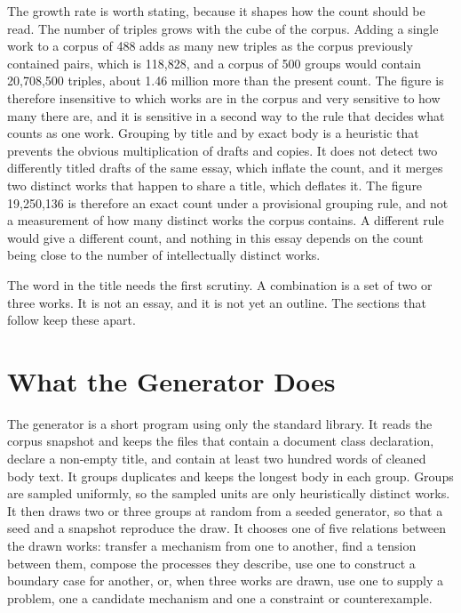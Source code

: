 \documentclass[11pt]{article}
\begin{document}
The growth rate is worth stating, because it shapes how the count should be read. The number of triples grows with the cube of the corpus. Adding a single work to a corpus of 488 adds as many new triples as the corpus previously contained pairs, which is 118,828, and a corpus of 500 groups would contain 20,708,500 triples, about 1.46 million more than the present count. The figure is therefore insensitive to which works are in the corpus and very sensitive to how many there are, and it is sensitive in a second way to the rule that decides what counts as one work. Grouping by title and by exact body is a heuristic that prevents the obvious multiplication of drafts and copies. It does not detect two differently titled drafts of the same essay, which inflate the count, and it merges two distinct works that happen to share a title, which deflates it. The figure 19,250,136 is therefore an exact count under a provisional grouping rule, and not a measurement of how many distinct works the corpus contains. A different rule would give a different count, and nothing in this essay depends on the count being close to the number of intellectually distinct works.

The word in the title needs the first scrutiny. A combination is a set of two or three works. It is not an essay, and it is not yet an outline. The sections that follow keep these apart.

\section{What the Generator Does}

The generator is a short program using only the standard library. It reads the corpus snapshot and keeps the files that contain a document class declaration, declare a non-empty title, and contain at least two hundred words of cleaned body text. It groups duplicates and keeps the longest body in each group. Groups are sampled uniformly, so the sampled units are only heuristically distinct works. It then draws two or three groups at random from a seeded generator, so that a seed and a snapshot reproduce the draw. It chooses one of five relations between the drawn works: transfer a mechanism from one to another, find a tension between them, compose the processes they describe, use one to construct a boundary case for another, or, when three works are drawn, use one to supply a problem, one a candidate mechanism and one a constraint or counterexample.
\end{document}
